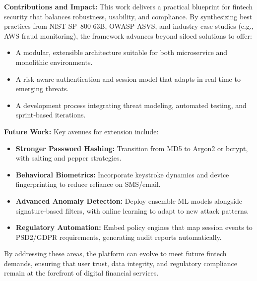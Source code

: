 \medskip

\noindent\textbf{Contributions and Impact:}  
This work delivers a practical blueprint for fintech security that balances robustness, usability, and compliance. By synthesizing best practices from NIST SP 800‑63B, OWASP ASVS, and industry case studies (e.g., AWS fraud monitoring), the framework advances beyond siloed solutions to offer:

\begin{itemize}
  \item A modular, extensible architecture suitable for both microservice and monolithic environments.
  \item A risk‑aware authentication and session model that adapts in real time to emerging threats.
  \item A development process integrating threat modeling, automated testing, and sprint‑based iterations.
\end{itemize}

\medskip

\noindent\textbf{Future Work:}  
Key avenues for extension include:

\begin{itemize}
  \item \textbf{Stronger Password Hashing:} Transition from MD5 to Argon2 or bcrypt, with salting and pepper strategies.
  \item \textbf{Behavioral Biometrics:} Incorporate keystroke dynamics and device fingerprinting to reduce reliance on SMS/email.
  \item \textbf{Advanced Anomaly Detection:} Deploy ensemble ML models alongside signature‑based filters, with online learning to adapt to new attack patterns.
  \item \textbf{Regulatory Automation:} Embed policy engines that map session events to PSD2/GDPR requirements, generating audit reports automatically.
\end{itemize}

By addressing these areas, the platform can evolve to meet future fintech demands, ensuring that user trust, data integrity, and regulatory compliance remain at the forefront of digital financial services.
